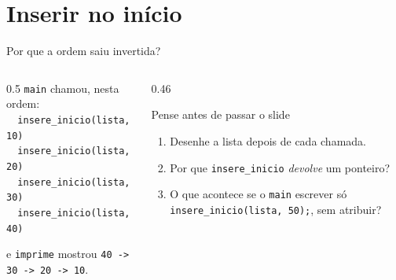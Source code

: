 \documentclass[aspectratio=169]{beamer}
\begin{document}
\section{Inserir no início}

\begin{frame}{Por que a ordem saiu invertida?}
  \begin{columns}[c]
    \begin{column}{0.5\textwidth}
      \small
      \texttt{main} chamou, nesta ordem:\\[0.3em]
      \texttt{\ \ insere\_inicio(lista, 10)}\\
      \texttt{\ \ insere\_inicio(lista, 20)}\\
      \texttt{\ \ insere\_inicio(lista, 30)}\\
      \texttt{\ \ insere\_inicio(lista, 40)}

      \medskip
      e \texttt{imprime} mostrou \texttt{40 -> 30 -> 20 -> 10}.
    \end{column}
    \begin{column}{0.46\textwidth}
      \begin{block}{Pense antes de passar o slide}
        \small
        \begin{enumerate}
          \item Desenhe a lista depois de cada chamada.
          \item Por que \texttt{insere\_inicio} \emph{devolve} um ponteiro?
          \item O que acontece se o \texttt{main} escrever só
            \texttt{insere\_inicio(lista, 50);}, sem atribuir?
        \end{enumerate}
      \end{block}
    \end{column}
  \end{columns}
\end{frame}
\end{document}
